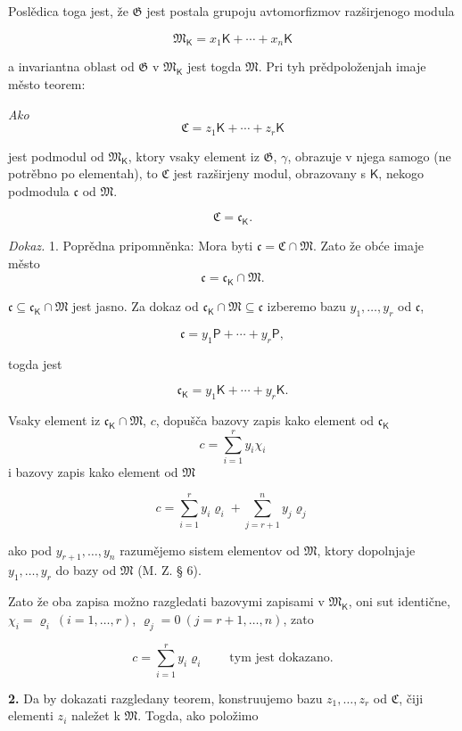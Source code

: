 \documentclass[11pt]{article}
\begin{document}
Poslědica toga jest, že \(\mathfrak G\) jest postala grupoju avtomorfizmov razširjenogo modula

\[
\mathfrak M_{\mathsf K}=x_1\mathsf K+\cdots+x_n\mathsf K
\]

a invariantna oblast od \(\mathfrak G\) v \(\mathfrak M_{\mathsf K}\) jest togda \(\mathfrak M\). Pri tyh prědpoloženjah imaje město teorem:

\begingroup\itshape
Ako
\[
\mathfrak C=z_1\mathsf K+\cdots+z_r\mathsf K
\]

jest podmodul od \(\mathfrak M_{\mathsf K}\), ktory vsaky element iz \(\mathfrak G\), \(\gamma\), obrazuje v njega samogo (ne potrěbno po elementah), to \(\mathfrak C\) jest razširjeny modul, obrazovany s \(\mathsf K\), nekogo podmodula \(\mathfrak c\) od \(\mathfrak M\).

\[
\mathfrak C=\mathfrak c_{\mathsf K}.
\]
\endgroup

\emph{Dokaz.} 1. Poprědna pripomněnka: Mora byti \(\mathfrak c=\mathfrak C\cap\mathfrak M\). Zato že obće imaje město
\[
\mathfrak c=\mathfrak c_{\mathsf K}\cap\mathfrak M.
\]

\(\mathfrak c\subseteq\mathfrak c_{\mathsf K}\cap\mathfrak M\) jest jasno. Za dokaz od \(\mathfrak c_{\mathsf K}\cap\mathfrak M\subseteq\mathfrak c\) izberemo bazu \(y_1,\ldots,y_r\) od \(\mathfrak c\),

\[
\mathfrak c=y_1\mathsf P+\cdots+y_r\mathsf P,
\]

togda jest

\[
\mathfrak c_{\mathsf K}=y_1\mathsf K+\cdots+y_r\mathsf K.
\]

Vsaky element iz \(\mathfrak c_{\mathsf K}\cap\mathfrak M\), \(c\), dopušča bazovy zapis kako element od \(\mathfrak c_{\mathsf K}\)
\[
c=\sum_{i=1}^{r}y_i\chi_i
\]
i bazovy zapis kako element od \(\mathfrak M\)

\[
c=\sum_{i=1}^{r}y_i\varrho_i+\sum_{j=r+1}^{n}y_j\varrho_j
\]

ako pod \(y_{r+1},\ldots,y_n\) razumějemo sistem elementov od \(\mathfrak M\), ktory dopolnjaje \(y_1,\ldots,y_r\) do bazy od \(\mathfrak M\) (M. Z. § 6).

Zato že oba zapisa možno razgledati bazovymi zapisami v \(\mathfrak M_{\mathsf K}\), oni sut identične, \(\chi_i=\varrho_i\ (i=1,\ldots,r)\), \(\varrho_j=0\ (j=r+1,\ldots,n)\), zato

\[
c=\sum_{i=1}^{r}y_i\varrho_i
\qquad\text{tym jest dokazano.}
\]

\textbf{2.} Da by dokazati razgledany teorem, konstruujemo bazu \(z_1,\ldots,z_r\) od \(\mathfrak C\), čiji elementi \(z_i\) naležet k \(\mathfrak M\). Togda, ako položimo
\end{document}
